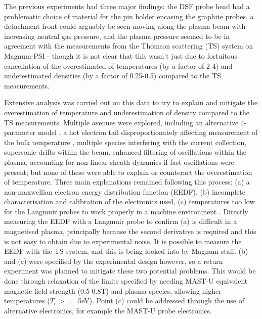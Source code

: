 \documentclass[a4paper, 12pt]{article} %
\begin{document}
    The previous experiments had three major findings: the DSF probe head had a problematic choice of material for the pin holder encasing the graphite probes, a detachment front could arguably be seen moving along the plasma beam with increasing neutral gas pressure, and the plasma pressure seemed to be in agreement with the measurements from the Thomson scattering (TS) system on Magnum-PSI - though it is not clear that this wasn't just due to fortuitous cancellation of the overestimated of temperatures (by a factor of 2-4) and underestimated densities (by a factor of 0.25-0.5) compared to the TS measurements.
    
    Extensive analysis was carried out on this data to try to explain and mitigate the overestimation of temperature and underestimation of density compared to the TS measurements. 
    Multiple avenues were explored, including an alternative 4-parameter model \cite{Gunn1995}, a hot electron tail disproportionately affecting measurement of the bulk temperature \cite{Stangeby1995a}, multiple species interfering with the current collection, supersonic drifts within the beam, enhanced filtering of oscillations within the plasma, accounting for non-linear sheath dynamics if fast oscillations were present; but none of these were able to explain or counteract the overestimation of temperature. 
    Three main explanations remained following this process: (a) a non-maxwellian electron energy distribution function (EEDF), (b) incomplete characterisation and calibration of the electronics used, (c) temperatures too low for the Langmuir probes to work properly in a machine environment \cite{Stangeby2000}.
    Directly measuring the EEDF with a Langmuir probe to confirm (a) is difficult in a magnetised plasma, principally because the second derivative is required and this is not easy to obtain due to experimental noise. 
    It is possible to measure the EEDF with the TS system, and this is being looked into by Magnum staff. 
    (b) and (c) were specified by the experimental design however, so a return experiment was planned to mitigate these two potential problems. 
    This would be done through relaxation of the limits specified by needing MAST-U equivalent magnetic field strength (0.5-0.8T) and plasma species, allowing higher temperatures ($ T_e >=$ 5eV).
    Point (c) could be addressed through the use of alternative electronics, for example the MAST-U probe electronics.
	
\end{document}
